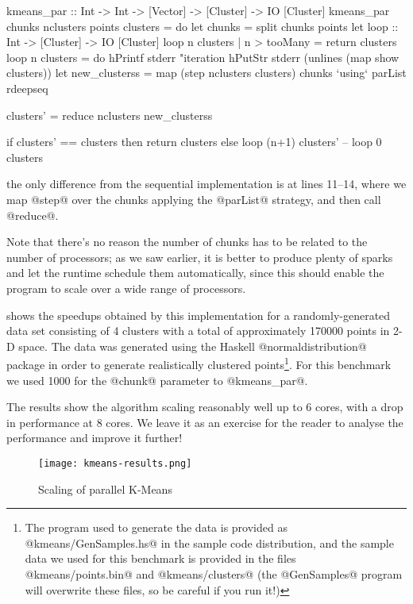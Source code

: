 \begin{numhaskell}
kmeans_par :: Int -> Int -> [Vector] -> [Cluster]
           -> IO [Cluster]
kmeans_par chunks nclusters points clusters = do
  let chunks = split chunks points
  let
      loop :: Int -> [Cluster] -> IO [Cluster]
      loop n clusters | n > tooMany = return clusters
      loop n clusters = do
        hPrintf stderr "iteration %
        hPutStr stderr (unlines (map show clusters))
        let
             new_clusterss =
                map (step nclusters clusters) chunks
                   `using` parList rdeepseq

             clusters' = reduce nclusters new_clusterss

        if clusters' == clusters
           then return clusters
           else loop (n+1) clusters'
  --
  loop 0 clusters
\end{numhaskell}

\noindent the only difference from the sequential implementation is at
lines 11--14, where we map @step@ over the chunks applying the
@parList@ strategy, and then call @reduce@.

Note that there's no reason the number of chunks has to be related to
the number of processors; as we saw earlier, it is better to produce
plenty of sparks and let the runtime schedule them automatically,
since this should enable the program to scale over a wide range of
processors.

 shows the speedups obtained by this
implementation for a randomly-generated data set consisting of 4
clusters with a total of approximately 170000 points in 2-D space.
The data was generated using the Haskell @normaldistribution@ package
in order to generate realistically clustered points\footnote{The
  program used to generate the data is provided as
  @kmeans/GenSamples.hs@ in the sample code distribution, and the
  sample data we used for this benchmark is provided in the files
  @kmeans/points.bin@ and @kmeans/clusters@ (the @GenSamples@ program
  will overwrite these files, so be careful if you run it!)}.  For this
benchmark we used 1000 for the @chunk@ parameter to @kmeans_par@.

The results show the algorithm scaling reasonably well up to 6 cores,
with a drop in performance at 8 cores.  We leave it as an exercise for
the reader to analyse the performance and improve it further!

\begin{figure}
\begin{center}
\texttt{[image: kmeans-results.png]}
\end{center}
\caption{Scaling of parallel K-Means}
\label{fig:kmeans-results}
\end{figure}

